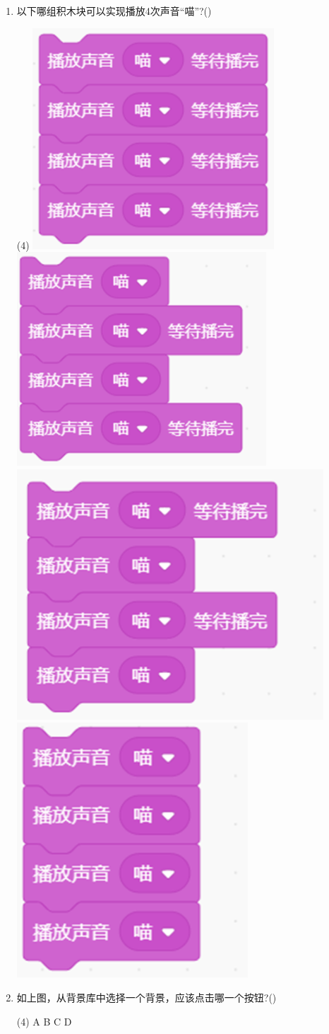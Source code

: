 \documentclass[10.5pt, a4paper]{article}
\begin{document}
\begin{enumerate}
        \item 以下哪组积木块可以实现播放4次声音“喵”?(\qquad)
        \begin{tasks}(4)
            \task \includegraphics[width=.15\textwidth]{10a.png}
            \task \includegraphics[width=.16\textwidth]{10b.png}
            \task \includegraphics[width=.17\textwidth]{10c.png}
            \task \includegraphics[width=.125\textwidth]{10d.png}
        \end{tasks}

        \item 如上图，从背景库中选择一个背景，应该点击哪一个按钮?(\qquad)
        \begin{tasks}(4)
            \task A
            \task B
            \task C
            \task D
        \end{tasks}


\end{enumerate}
\end{document}
